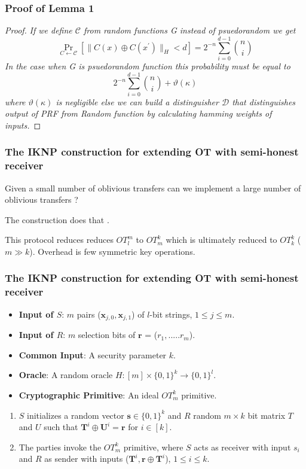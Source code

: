 \documentclass[hyperref={pdfpagelabels=false}]{beamer}
\theoremstyle{remark}
\begin{document}
\begin{frame}
\frametitle{Proof of Lemma 1}
\begin{proof}
\textit{If we define $\mathcal{C}$ from random functions G instead of psuedorandom we get\pause
\begin{equation*}
\Pr_{C\leftarrow \mathcal{C}} \left[ \|C(x) \oplus C(x^\prime)\|_H < d \right] = 2^{-n}\sum_{i=0}^{d-1} {n \choose i}
\end{equation*}\pause
In the case when G is psuedorandom function this probability must be equal to
\begin{equation*}
2^{-n}\sum_{i=0}^{d-1} {n \choose i} + \vartheta(\kappa)
\end{equation*}\pause
where $\vartheta(\kappa)$ is negligible
else we can build a distinguisher $\mathcal{D}$ that distinguishes output of PRF from Random function by calculating hamming weights of inputs.}
\end{proof}

\end{frame}

\begin{frame}
\frametitle{The IKNP construction for extending OT with semi-honest receiver}
Given a small number of oblivious transfers can we implement a large number of oblivious transfers ? \par \pause
The \cite{IKNP} construction does that \smiley{}.\par \pause
This protocol reduces reduces $OT_l^m$ to $OT_m^k$ which is ultimately reduced to $OT_k^k$ ($m \gg k$). Overhead is few symmetric key operations.
\end{frame}

\begin{frame}
\frametitle{The IKNP construction for extending OT with semi-honest receiver}
\begin{itemize}
\item \textbf{Input of $S$}: $m$ pairs ($\mathbf{x}_{j,0}, \mathbf{x}_{j,1}$) of $l$-bit strings, $1 \leq j \leq m$. \pause
\item \textbf{Input of $R$}: $m$ selection bits of $\mathbf{r}$ = ($r_1,.....r_m$). \pause
\item \textbf{Common Input}: A security parameter $k$.\pause
\item \textbf{Oracle}: A random oracle $H : \left[m\right] \times \{0,1\}^k \rightarrow \{0,1\}^l$. \pause
\item \textbf{Cryptographic Primitive}: An ideal $OT_m^k$ primitive.\pause
\end{itemize}
\begin{enumerate}
\item $S$ initializes a random vector $\mathbf{s} \in \{0,1\}^k$ and $R$ random $m \times k$ bit matrix $T$ and $U$ such that $\mathbf{T}^i \oplus \mathbf{U}^i = \mathbf{r}$ for $i \in [k]$. \pause
\item The parties invoke the $OT_m^k$ primitive, where $S$ acts as receiver with input $s_i$ and $R$ as sender with inputs ($\mathbf{T}^i, \mathbf{r} \oplus \mathbf{T}^i$), $1 \leq i \leq k$.
\end{enumerate}

\end{frame}
\end{document}

